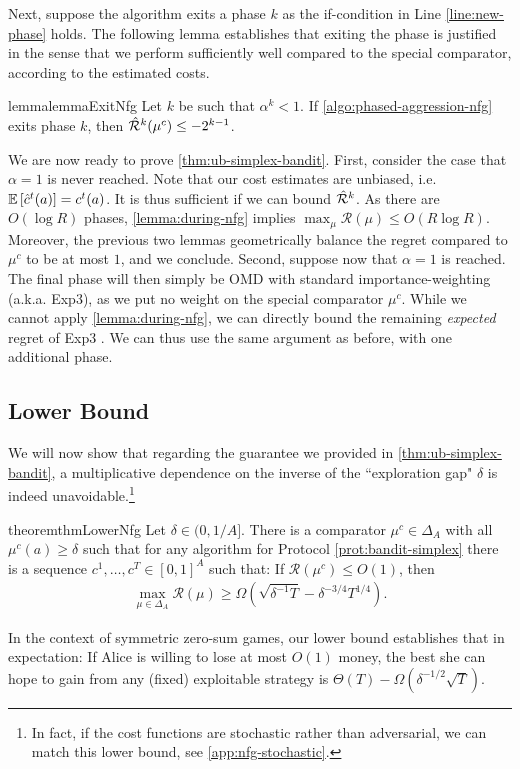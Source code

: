 \documentclass[11pt]{article}
\begin{document}
\noindent Next, suppose the algorithm exits a phase $k$ as the if-condition in Line \ref{line:new-phase} holds. The following lemma establishes that exiting the phase is justified in the sense that we perform sufficiently well compared to the special comparator, according to the estimated costs. 
\begin{restatable}{lemma}{lemmaExitNfg} \label{lemma:exit-nfg}
    Let $k$ be such that $\alpha^k<1$. If \cref{algo:phased-aggression-nfg} exits phase $k$, then $\hat{\mathcal{R}}^k(\mu^c)\leq -2^{k-1}$.
\end{restatable}
We are now ready to prove \cref{thm:ub-simplex-bandit}. First, consider the case that $\alpha=1$ is never reached. 
Note that our cost estimates are unbiased, i.e. $\mathbb{E}\left[ \hat{c}^t(a) \right] = c^t(a)$. It is thus sufficient if we can bound $\hat{\mathcal{R}}^k$. As there are $O(\log R)$ phases, \cref{lemma:during-nfg} implies $\max_{\mu} \mathcal{R}(\mu) \leq O(R\log R)$. Moreover, the previous two lemmas geometrically balance the regret compared to $\mu^c$ to be at most $1$, and we conclude. Second, suppose now that $\alpha=1$ is reached. The final phase will then simply be OMD with standard importance-weighting (a.k.a. Exp3), as we put no weight on the special comparator $\mu^c$. While we cannot apply \cref{lemma:during-nfg}, we can directly bound the remaining \emph{expected} regret of Exp3 \citep{orabona2019modern}. We can thus use the same argument as before, with one additional phase.

\subsection{Lower Bound} \label{sec:nfg-lower}

We will now show that regarding the guarantee we provided in \cref{thm:ub-simplex-bandit}, a multiplicative dependence on the inverse of the ``exploration gap" $\delta$ is indeed unavoidable.\footnote{In fact, if the cost functions are stochastic rather than adversarial, we can match this lower bound, see \cref{app:nfg-stochastic}.}
\begin{restatable}{theorem}{thmLowerNfg} \label{thm:lower-nfg}
    Let $\delta\in(0,1/A]$. There is a comparator $\mu^c\in\Delta_A$ with all $\mu^c(a) \geq \delta$ such that for any algorithm for Protocol \ref{prot:bandit-simplex} there is a sequence $c^1,\dots,c^T\in[0,1]^A$ such that: If $\mathcal{R}(\mu^c) \leq O(1)$, then  
    \begin{align*}
        \max_{\mu\in\Delta_A} \mathcal{R}(\mu) \geq \Omega(\sqrt{\delta^{-1}T}-\delta^{-3/4}T^{1/4}).
    \end{align*}
\end{restatable}
In the context of symmetric zero-sum games, our lower bound establishes that in expectation: If Alice is willing to lose at most $O(1)$ money, the best she can hope to gain from any (fixed) exploitable strategy is $\Theta(T) - \Omega(\delta^{-1/2}\sqrt{T})$.
\end{document}
